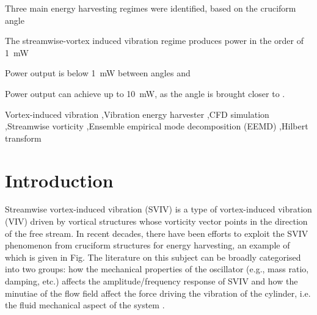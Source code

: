 \documentclass[a4paper,fleqn]{cas-sc}
\begin{document}
\begin{highlights}
\item Three main energy harvesting regimes were identified, based on the cruciform angle
\item The streamwise-vortex induced vibration regime produces power in the order of \SI{1}{\milli\watt}
\item Power output is below \SI{1}{\milli\watt} between angles \angfo{} and \angtw{}
\item Power output can achieve up to \SI{10}{\milli\watt}, as the angle is brought closer to \angon{}.
\end{highlights}
\begin{keywords}
  Vortex-induced vibration \sep Vibration energy harvester \sep CFD simulation \sep Streamwise vorticity \sep Ensemble empirical mode decomposition (EEMD) \sep Hilbert transform
\end{keywords}


\maketitle

\doublespacing

\section{Introduction} \label{sec:intro}
Streamwise vortex-induced vibration (SVIV) is a type of vortex-induced vibration (VIV) driven by vortical structures whose vorticity vector points in the direction of the free stream. In recent decades, there have been efforts to exploit the SVIV phenomenon from cruciform structures for energy harvesting, an example of which is given in Fig. The literature on this subject can be broadly categorised into two groups: how the mechanical properties of the oscillator (e.g., mass ratio, damping, etc.) affects the amplitude/frequency response of SVIV \citep{Koide2009,Koide2013,Nguyen2012} and how the minutiae of the flow field affect the force driving the vibration of the cylinder, i.e. the fluid mechanical aspect of the system \citep{Deng2007,Koide2017,Zhao2018a}.
\end{document}
